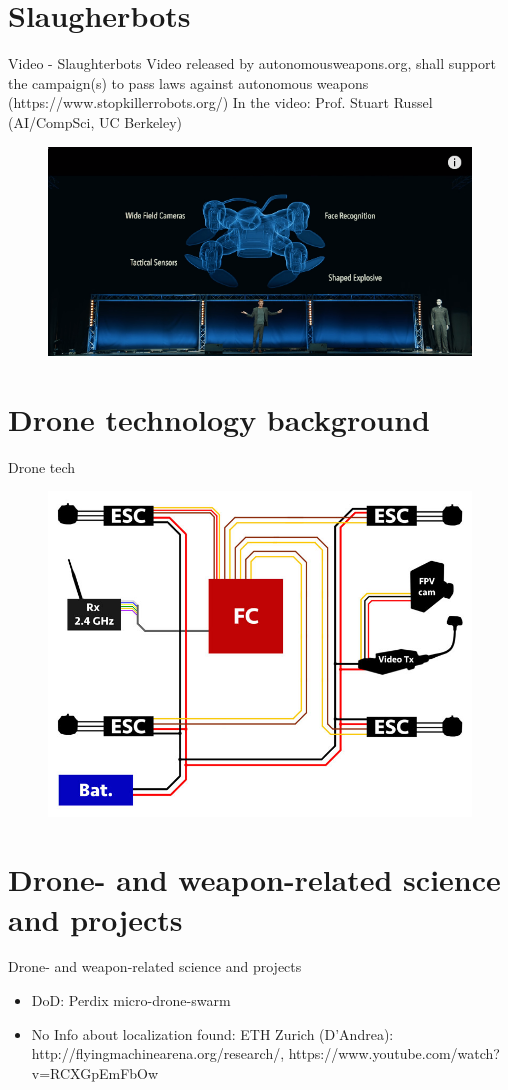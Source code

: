 \documentclass[aspectratio=169]{beamer}
\begin{document}
\section{Slaugherbots}
	\begin{frame}{Video - Slaughterbots}
		Video released by autonomousweapons.org, shall support the campaign(s) to pass laws against autonomous weapons (https://www.stopkillerrobots.org/)
		In the video: Prof. Stuart Russel (AI/CompSci, UC Berkeley)
		\begin{figure}
			\includegraphics[width=.8\linewidth]{images/slaughterbots.png}
		\end{figure}
	\end{frame}

\section{Drone technology background}
\begin{frame}{Drone tech}
	\begin{figure}
		\includegraphics[width=0.6\linewidth]{images/06-FPV-Overview_1.jpg}
	\end{figure}
	\color{gray}{http://fpvracing.ch/img/cms/infobereich/Bauanleitung/06-FPV-Overview\_1.jpg}
\end{frame}

\section{Drone- and weapon-related science and projects}
\begin{frame}{Drone- and weapon-related science and projects}
	\begin{itemize}
		\item DoD: Perdix micro-drone-swarm
		\item No Info about localization found: ETH Zurich (D'Andrea): http://flyingmachinearena.org/research/, https://www.youtube.com/watch?v=RCXGpEmFbOw
	\end{itemize}
\end{frame}
\end{document}
